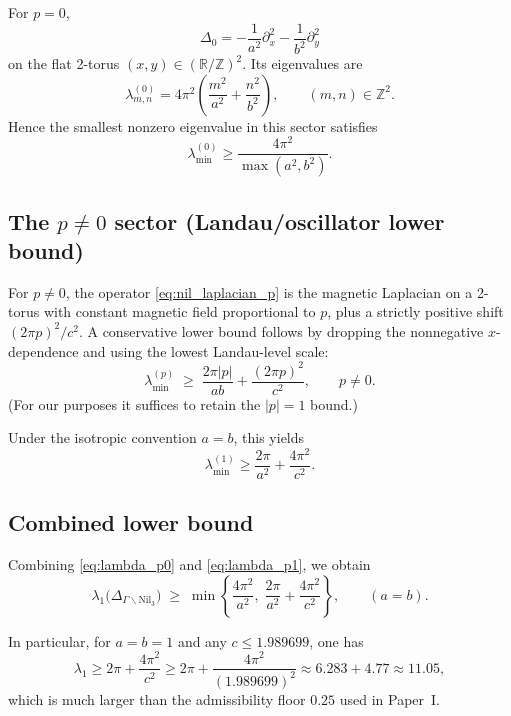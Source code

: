 \documentclass[11pt]{article}
\begin{document}
For $p=0$,
\[
\Delta_0 = -\frac{1}{a^2}\partial_x^2-\frac{1}{b^2}\partial_y^2
\]
on the flat 2-torus $(x,y)\in(\mathbb{R}/\mathbb{Z})^2$.
Its eigenvalues are
\[
\lambda^{(0)}_{m,n} = 4\pi^2\left(\frac{m^2}{a^2}+\frac{n^2}{b^2}\right),
\qquad (m,n)\in\mathbb{Z}^2.
\]
Hence the smallest nonzero eigenvalue in this sector satisfies
\begin{equation}
\lambda_{\min}^{(0)} \ge \frac{4\pi^2}{\max(a^2,b^2)}.
\label{eq:lambda_p0}
\end{equation}

\subsection{The $p\neq 0$ sector (Landau/oscillator lower bound)}

For $p\neq 0$, the operator \eqref{eq:nil_laplacian_p} is the magnetic Laplacian on a 2-torus
with constant magnetic field proportional to $p$, plus a strictly positive shift $(2\pi p)^2/c^2$.
A conservative lower bound follows by dropping the nonnegative $x$-dependence and using the
lowest Landau-level scale:
\begin{equation}
\lambda_{\min}^{(p)} \;\ge\; \frac{2\pi |p|}{ab} + \frac{(2\pi p)^2}{c^2},
\qquad p\neq 0.
\label{eq:lambda_pnonzero}
\end{equation}
(For our purposes it suffices to retain the $|p|=1$ bound.)

Under the isotropic convention $a=b$, this yields
\begin{equation}
\lambda_{\min}^{(1)} \ge \frac{2\pi}{a^2}+\frac{4\pi^2}{c^2}.
\label{eq:lambda_p1}
\end{equation}

\subsection{Combined lower bound}

Combining \eqref{eq:lambda_p0} and \eqref{eq:lambda_p1}, we obtain
\begin{equation}
\lambda_1\big(\Delta_{\Gamma\backslash\mathrm{Nil}_3}\big)
\;\ge\;
\min\left\{
\frac{4\pi^2}{a^2},
\;
\frac{2\pi}{a^2}+\frac{4\pi^2}{c^2}
\right\},
\qquad (a=b).
\label{eq:lambda_min_final}
\end{equation}

In particular, for $a=b=1$ and any $c\le 1.989699$, one has
\[
\lambda_1 \ge 2\pi + \frac{4\pi^2}{c^2}
\ge 2\pi + \frac{4\pi^2}{(1.989699)^2}
\approx 6.283 + 4.77 \approx 11.05,
\]
which is much larger than the admissibility floor $0.25$ used in Paper~I.
\end{document}

